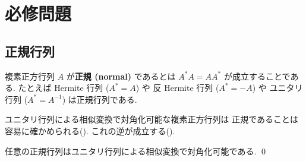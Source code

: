 \documentclass[12pt,twoside]{jarticle}
\newcommand\commentout[1]{#1}
\newcommand\commentout[1]{}
\begin{document}






\section{必修問題}


\subsection{正規行列}

複素正方行列 $A$ が{\bf 正規 (normal)} であるとは $A^*A=AA^*$ 
が成立することである. 
たとえば Hermite 行列 ($A^*=A$) や
反 Hermite 行列 ($A^*=-A$) や
ユニタリ行列 ($A^*=A^{-1}$) は正規行列である.

ユニタリ行列による相似変換で対角化可能な複素正方行列は
正規であることは容易に確かめられる().
これの逆が成立する().

\begin{theorem}
  任意の正規行列はユニタリ行列による相似変換で対角化可能である. \qed
\end{theorem}
\end{document}
